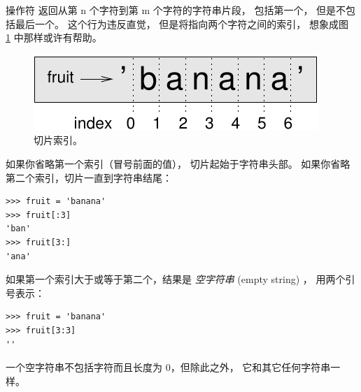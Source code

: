 %

操作符 \li{[n:m]} 返回从第 n 个字符到第 m 个字符的字符串片段， 包括第一个， 但是不包括最后一个。 这个行为违反直觉， 但是将指向两个字符之间的索引， 想象成图~ \ref{fig.banana} 中那样或许有帮助。

\begin{figure}
\centerline
{\includegraphics[scale=0.8]{../source/figs/banana.pdf}}
\caption{切片索引。}
\label{fig.banana}
\end{figure}


如果你省略第一个索引（冒号前面的值）， 切片起始于字符串头部。 如果你省略第二个索引，切片一直到字符串结尾：

\begin{lstlisting}
>>> fruit = 'banana'
>>> fruit[:3]
'ban'
>>> fruit[3:]
'ana'
\end{lstlisting}

%

如果第一个索引大于或等于第二个，结果是 {\em 空字符串} (empty string) ， 用两个引号表示：

\begin{lstlisting}
>>> fruit = 'banana'
>>> fruit[3:3]
''
\end{lstlisting}

%

一个空字符串不包括字符而且长度为 0，但除此之外， 它和其它任何字符串一样。

